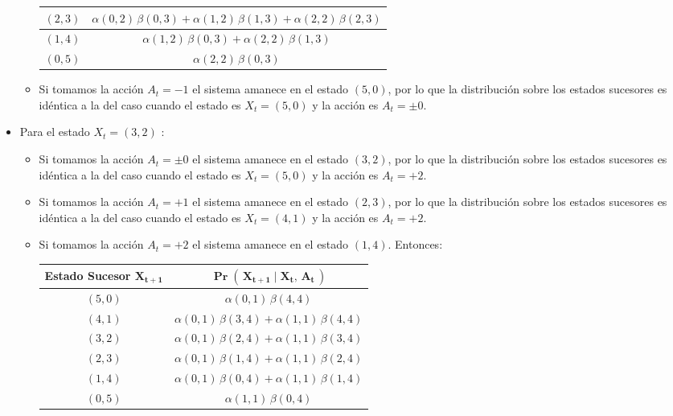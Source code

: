 \documentclass[ a4paper, twoside, 11pt]{article}
\begin{document}
\begin{problem}
\begin{itemize}
\begin{itemize}
\begin{table}[H]
\begin{tabular}{|c|c|}
$(2,3)$ & $\alpha(0,2) \, \beta(0,3) + \alpha(1,2) \, \beta(1,3) + \alpha(2,2) \, \beta(2,3)$ \\ \hline
$(1,4)$ & $\alpha(1,2) \, \beta(0,3) + \alpha(2,2) \, \beta(1,3)$ \\ \hline
$(0,5)$ & $\alpha(2,2) \, \beta(0,3)$ \\ \hline
\end{tabular}
\end{table}
\item Si tomamos la acci\'on $A_t = -1$ el sistema amanece en el estado $(5,0)$, por lo que la distribuci\'on sobre los estados sucesores es id\'entica a la del caso cuando el estado es $X_t = (5,0)$ y la acci\'on es $A_t = \pm 0$. 
\end{itemize}
\item Para el estado $X_t = (3,2)$ :
\begin{itemize}
\item Si tomamos la acci\'on $A_t = \pm 0$ el sistema amanece en el estado $(3,2)$, por lo que la distribuci\'on sobre los estados sucesores es id\'entica a la del caso cuando el estado es $X_t = (5,0)$ y la acci\'on es $A_t = +2$. 
\item Si tomamos la acci\'on $A_t = +1$ el sistema amanece en el estado $(2,3)$, por lo que la distribuci\'on sobre los estados sucesores es id\'entica a la del caso cuando el estado es $X_t = (4,1)$ y la acci\'on es $A_t = +2$. 
\item Si tomamos la acci\'on $A_t = +2$ el sistema amanece en el estado $(1,4)$. Entonces: 
\begin{table}[H]
\centering
\begin{tabular}{|c|c|}
\hline
\textbf{Estado Sucesor} $\boldsymbol{X_{t+1}}$
& $\boldsymbol{\Pr( \, X_{t+1} \mid X_t, \, A_t \, )}$ \\ \hline
$(5,0)$ & $\alpha(0,1) \, \beta(4,4)$ \\ \hline
$(4,1)$ & $\alpha(0,1) \, \beta(3,4) + \alpha(1,1) \, \beta(4,4)$ \\ \hline
$(3,2)$ & $\alpha(0,1) \, \beta(2,4) + \alpha(1,1) \, \beta(3,4)$ \\ \hline
$(2,3)$ & $\alpha(0,1) \, \beta(1,4) + \alpha(1,1) \, \beta(2,4)$ \\ \hline
$(1,4)$ & $\alpha(0,1) \, \beta(0,4) + \alpha(1,1) \, \beta(1,4)$ \\ \hline
$(0,5)$ & $\alpha(1,1) \, \beta(0,4)$ \\ \hline
\end{tabular}

\end{table}
\end{itemize}
\end{itemize}
\end{problem}
\end{document}
